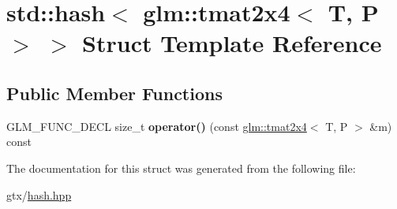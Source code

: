 \hypertarget{structstd_1_1hash_3_01glm_1_1tmat2x4_3_01T_00_01P_01_4_01_4}{\section{std\-:\-:hash$<$ glm\-:\-:tmat2x4$<$ T, P $>$ $>$ Struct Template Reference}
\label{structstd_1_1hash_3_01glm_1_1tmat2x4_3_01T_00_01P_01_4_01_4}
}
\subsection*{Public Member Functions}
\begin{DoxyCompactItemize}
\item 
\hypertarget{structstd_1_1hash_3_01glm_1_1tmat2x4_3_01T_00_01P_01_4_01_4_ad435202648631a08e0f37961963a2c74}{G\-L\-M\-\_\-\-F\-U\-N\-C\-\_\-\-D\-E\-C\-L size\-\_\-t {\bfseries operator()} (const \hyperlink{structglm_1_1tmat2x4}{glm\-::tmat2x4}$<$ T, P $>$ \&m) const }\label{structstd_1_1hash_3_01glm_1_1tmat2x4_3_01T_00_01P_01_4_01_4_ad435202648631a08e0f37961963a2c74}

\end{DoxyCompactItemize}


The documentation for this struct was generated from the following file\-:\begin{DoxyCompactItemize}
\item 
gtx/\hyperlink{hash_8hpp}{hash.\-hpp}\end{DoxyCompactItemize}
